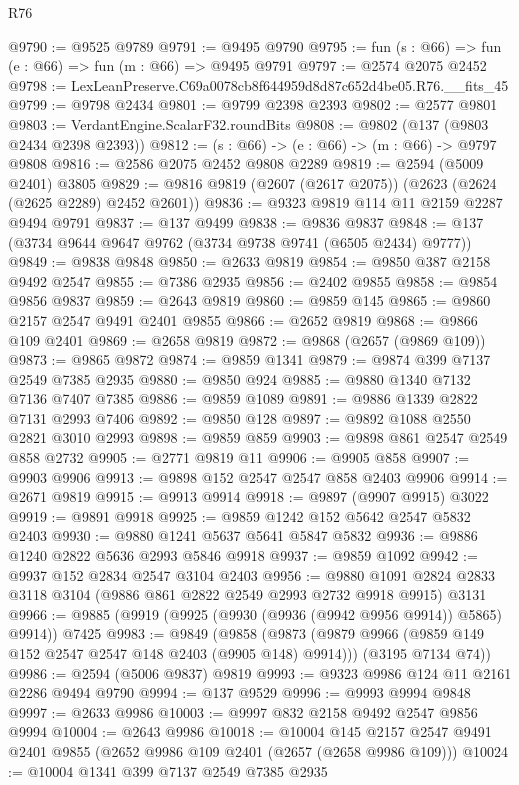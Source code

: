 \begin{lexlean}{R76}
\begin{coremodule}
@9790 := @9525 @9789
@9791 := @9495 @9790
@9795 := fun (s : @66) => fun (e : @66) => fun (m : @66) => @9495 @9791
@9797 := @2574 @2075 @2452
@9798 := LexLeanPreserve.C69a0078cb8f644959d8d87c652d4be05.R76.__fits_45
@9799 := @9798 @2434
@9801 := @9799 @2398 @2393
@9802 := @2577 @9801
@9803 := VerdantEngine.ScalarF32.roundBits
@9808 := @9802 (@137 (@9803 @2434 @2398 @2393))
@9812 := (s : @66) -> (e : @66) -> (m : @66) -> @9797 @9808
@9816 := @2586 @2075 @2452 @9808 @2289
@9819 := @2594 (@5009 @2401) @3805
@9829 := @9816 @9819 (@2607 (@2617 @2075)) (@2623 (@2624 (@2625 @2289) @2452 @2601))
@9836 := @9323 @9819 @114 @11 @2159 @2287 @9494 @9791
@9837 := @137 @9499
@9838 := @9836 @9837
@9848 := @137 (@3734 @9644 @9647 @9762 (@3734 @9738 @9741 (@6505 @2434) @9777))
@9849 := @9838 @9848
@9850 := @2633 @9819
@9854 := @9850 @387 @2158 @9492 @2547
@9855 := @7386 @2935
@9856 := @2402 @9855
@9858 := @9854 @9856 @9837
@9859 := @2643 @9819
@9860 := @9859 @145
@9865 := @9860 @2157 @2547 @9491 @2401 @9855
@9866 := @2652 @9819
@9868 := @9866 @109 @2401
@9869 := @2658 @9819
@9872 := @9868 (@2657 (@9869 @109))
@9873 := @9865 @9872
@9874 := @9859 @1341
@9879 := @9874 @399 @7137 @2549 @7385 @2935
@9880 := @9850 @924
@9885 := @9880 @1340 @7132 @7136 @7407 @7385
@9886 := @9859 @1089
@9891 := @9886 @1339 @2822 @7131 @2993 @7406
@9892 := @9850 @128
@9897 := @9892 @1088 @2550 @2821 @3010 @2993
@9898 := @9859 @859
@9903 := @9898 @861 @2547 @2549 @858 @2732
@9905 := @2771 @9819 @11
@9906 := @9905 @858
@9907 := @9903 @9906
@9913 := @9898 @152 @2547 @2547 @858 @2403 @9906
@9914 := @2671 @9819
@9915 := @9913 @9914
@9918 := @9897 (@9907 @9915) @3022
@9919 := @9891 @9918
@9925 := @9859 @1242 @152 @5642 @2547 @5832 @2403
@9930 := @9880 @1241 @5637 @5641 @5847 @5832
@9936 := @9886 @1240 @2822 @5636 @2993 @5846 @9918
@9937 := @9859 @1092
@9942 := @9937 @152 @2834 @2547 @3104 @2403
@9956 := @9880 @1091 @2824 @2833 @3118 @3104 (@9886 @861 @2822 @2549 @2993 @2732 @9918 @9915) @3131
@9966 := @9885 (@9919 (@9925 (@9930 (@9936 (@9942 @9956 @9914)) @5865) @9914)) @7425
@9983 := @9849
    (@9858
      (@9873 (@9879 @9966 (@9859 @149 @152 @2547 @2547 @148 @2403 (@9905 @148) @9914)))
      (@3195 @7134 @74))
@9986 := @2594 (@5006 @9837) @9819
@9993 := @9323 @9986 @124 @11 @2161 @2286 @9494 @9790
@9994 := @137 @9529
@9996 := @9993 @9994 @9848
@9997 := @2633 @9986
@10003 := @9997 @832 @2158 @9492 @2547 @9856 @9994
@10004 := @2643 @9986
@10018 := @10004
    @145
    @2157
    @2547
    @9491
    @2401
    @9855
    (@2652 @9986 @109 @2401 (@2657 (@2658 @9986 @109)))
@10024 := @10004 @1341 @399 @7137 @2549 @7385 @2935

\end{coremodule}
\end{lexlean}
